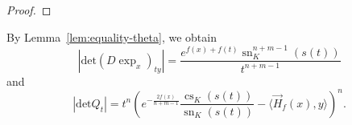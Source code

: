\documentclass[psamsfonts]{amsart}
\theoremstyle{definition}
\theoremstyle{remark}
\numberwithin{equation}{section}
\begin{document}
\begin{proof}

\end{proof}

By Lemma~\ref{lem:equality-theta}, we obtain
\begin{equation}\label{equality-dexp}
    |\mathrm{det} (D\exp_x)_{ty}| = \frac{e^{f(x) + f(t)}\operatorname{sn}_K^{n+m-1}(s(t))}{t^{n+m-1}}
\end{equation}
and
\begin{equation}\label{equality-qt}
    |\mathrm{det} Q_t| = t^n \left( e^{-\frac{2f(x)}{n+m-1}}\frac{\operatorname{cs}_K(s(t))}{\operatorname{sn}_K(s(t))} - \langle \vec H _f (x) , y \rangle \right)^n.
\end{equation}
\end{document}
